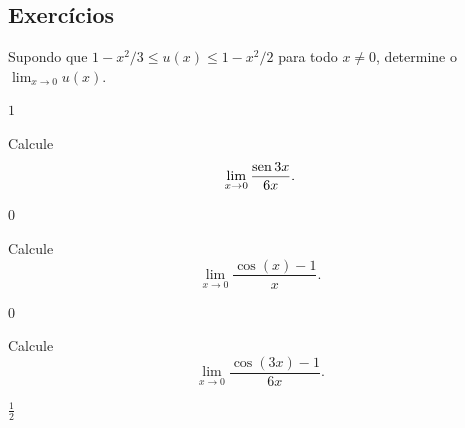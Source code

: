 \subsection*{Exercícios}

\begin{exer}
  Supondo que $1-x^2/3 \leq u(x) \leq 1-x^2/2$ para todo $x\neq 0$, determine o $\lim_{x\to 0} u(x)$.
\end{exer}
\begin{resp}
  $1$
\end{resp}

\begin{exer}
  Calcule
  \begin{equation}
    \lim_{x\to 0} \frac{\operatorname{sen} 3x}{6x}.
  \end{equation}
\end{exer}
\begin{resp}
  $0$
\end{resp}

\begin{exer}\label{exer:lim_cosx_1}
  Calcule
  \begin{equation}
    \lim_{x\to 0} \frac{\cos(x)-1}{x}.
  \end{equation}
\end{exer}
\begin{resp}
  $0$
\end{resp}

\begin{exer}
  Calcule
  \begin{equation}
    \lim_{x\to 0} \frac{\cos(3x)-1}{6x}.
  \end{equation}
\end{exer}
\begin{resp}
  $\frac{1}{2}$
\end{resp}

\emconstrucao
